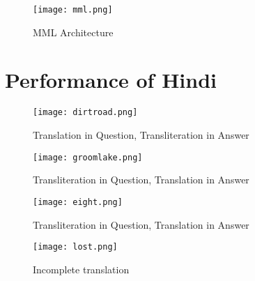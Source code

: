 \documentclass[12pt]{article}   %
\begin{document}
\begin{figure}[H]
\centering
\texttt{[image: mml.png]}
\caption{MML Architecture}
\label{fig:mml}
\end{figure}

\newpage
\section{Performance of Hindi}
\label{appendix:hindi}

\begin{figure}[h]
\centering

\texttt{[image: dirtroad.png]}
\caption{Translation in Question, Transliteration in Answer}
\label{fig:dirtroad}
\end{figure}

\begin{figure}[h]
\centering
\texttt{[image: groomlake.png]}
\caption{Transliteration in Question, Translation in Answer}
\label{fig:groomlake}
\end{figure}


\begin{figure}[h]
\centering
\texttt{[image: eight.png]}
\caption{Transliteration in Question, Translation in Answer}
\label{fig:eight}
\end{figure}

\begin{figure}[h]
\centering
\texttt{[image: lost.png]}
\caption{Incomplete translation}
\label{fig:lost}
\end{figure}
\end{document}
